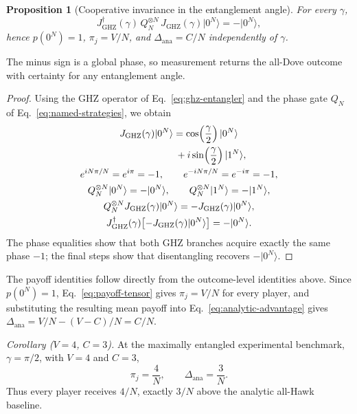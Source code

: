 \documentclass[conference,letterpaper,10pt]{IEEEtran}
\newtheorem{proposition}{Proposition}
\newcommand{\ket}[1]{\ensuremath{|#1\rangle}}
\begin{document}
\begin{proposition}[Cooperative invariance in the entanglement angle]
For every $\gamma$,
\begin{equation}
J_{\mathrm{GHZ}}^\dagger(\gamma)\,Q_N^{\otimes N}\,
J_{\mathrm{GHZ}}(\gamma)\ket{0^N}=-\ket{0^N},
\label{eq:ghz-cooperative-invariance}
\end{equation}
hence $p(0^N)=1$, $\pi_j=V/N$, and
$\Delta_{\mathrm{ana}}=C/N$ independently of $\gamma$.
\end{proposition}
The minus sign is a global phase, so measurement returns the all-Dove outcome
with certainty for any entanglement angle.

\begin{proof}
Using the GHZ operator of Eq.~\eqref{eq:ghz-entangler} and the phase gate
$Q_N$ of Eq.~\eqref{eq:named-strategies}, we obtain
\begin{gather*}
J_{\mathrm{GHZ}}(\gamma)\ket{0^N}
 =\cos\!\left(\frac{\gamma}{2}\right)\ket{0^N}\\
\hphantom{J_{\mathrm{GHZ}}(\gamma)\ket{0^N}=}
 +i\sin\!\left(\frac{\gamma}{2}\right)\ket{1^N},\\
e^{iN\pi/N}=e^{i\pi}=-1,\qquad
 e^{-iN\pi/N}=e^{-i\pi}=-1,\\
Q_N^{\otimes N}\ket{0^N}=-\ket{0^N},\qquad
 Q_N^{\otimes N}\ket{1^N}=-\ket{1^N},\\
Q_N^{\otimes N}J_{\mathrm{GHZ}}(\gamma)\ket{0^N}
 =-J_{\mathrm{GHZ}}(\gamma)\ket{0^N},\\
J_{\mathrm{GHZ}}^\dagger(\gamma)
 \bigl[-J_{\mathrm{GHZ}}(\gamma)\ket{0^N}\bigr]
 =-\ket{0^N}.
\end{gather*}
The phase equalities show that both GHZ branches acquire exactly the same phase
$-1$; the final steps show that disentangling recovers $-\ket{0^N}$.
\end{proof}

The payoff identities follow directly from the outcome-level identities
above. Since $p(0^N)=1$, Eq.~\eqref{eq:payoff-tensor} gives
$\pi_j=V/N$ for every player, and substituting the resulting mean payoff into
Eq.~\eqref{eq:analytic-advantage} gives
$\Delta_{\mathrm{ana}}=V/N-(V-C)/N=C/N$.

\noindent\textit{Corollary ($V=4$, $C=3$).} At the maximally entangled
experimental benchmark, $\gamma=\pi/2$, with $V=4$ and $C=3$,
\begin{equation}
\pi_j=\frac{4}{N},\qquad
\Delta_{\mathrm{ana}}=\frac{3}{N}.
\label{eq:ghz-live-benchmark}
\end{equation}
Thus every player receives $4/N$, exactly $3/N$ above the analytic all-Hawk
baseline.
\end{document}
